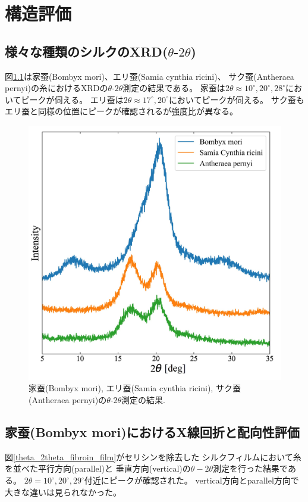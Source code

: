 \documentclass[dvipdfmx,12pt,a4paper]{jreport}
\begin{document}
	\chapter{構造評価}
			\section{様々な種類のシルクのXRD($\theta$-$2\theta$)}
			図\ref{様々な絹糸XRD}は家蚕(Bombyx mori)、エリ蚕(Samia cynthia ricini)、
			サク蚕(Antheraea pernyi)の糸におけるXRDの$\theta$-$2\theta$測定の結果である。
			家蚕は$2\theta \approx 10^{\circ}, 20^{\circ}, 28^{\circ}$においてピークが伺える。
			エリ蚕は$2\theta \approx 17^{\circ}, 20^{\circ}$においてピークが伺える。
			サク蚕もエリ蚕と同様の位置にピークが確認されるが強度比が異なる。
			\begin{figure}[h]
				\centering
				\includegraphics[scale=0.8]{糸の種類別XRD.jpg}
				\caption{家蚕(Bombyx mori), エリ蚕(Samia cynthia ricini), 
				サク蚕(Antheraea pernyi)の$\theta$-$2\theta$測定の結果.}
				\label{様々な絹糸XRD}
			\end{figure}
			\newpage
			\section{家蚕(Bombyx mori)におけるX線回折と配向性評価}
			図\ref{theta_2theta_fibroin_film}がセリシンを除去した
			シルクフィルムにおいて糸を並べた平行方向(parallel)と
			垂直方向(vertical)の$\theta - 2\theta$測定を行った結果である。
			$2\theta = 10^{\circ}, 20^{\circ}, 29^{\circ}$付近にピークが確認された。
			vertical方向とparallel方向で大きな違いは見られなかった。
			
\end{document}
